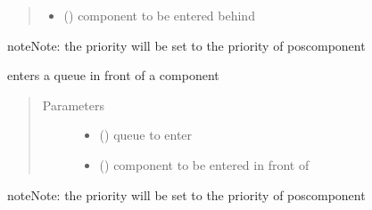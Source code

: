 \documentclass[letterpaper,10pt,english]{sphinxmanual}
\begin{document}
\begin{fulllineitems}
\begin{fulllineitems}
\begin{quote}
\begin{description}
\begin{itemize}
\item {} 
 ({\hyperref[\detokenize{Reference:salabim.Component}]{}}) \textendash{} component to be entered behind

\end{itemize}

\end{description}\end{quote}

\begin{sphinxadmonition}{note}{Note:}
the priority will be set to the priority of poscomponent
\end{sphinxadmonition}

\end{fulllineitems}


\begin{fulllineitems}
\label{\detokenize{Reference:salabim.Component.enter_in_front_of}}
enters a queue in front of a component
\begin{quote}\begin{description}
\item[{Parameters}] \leavevmode\begin{itemize}
\item {} 
 ({\hyperref[\detokenize{Reference:salabim.Queue}]{}}) \textendash{} queue to enter

\item {} 
 ({\hyperref[\detokenize{Reference:salabim.Component}]{}}) \textendash{} component to be entered in front of

\end{itemize}

\end{description}\end{quote}

\begin{sphinxadmonition}{note}{Note:}
the priority will be set to the priority of poscomponent
\end{sphinxadmonition}


\end{fulllineitems}
\end{fulllineitems}
\end{document}
